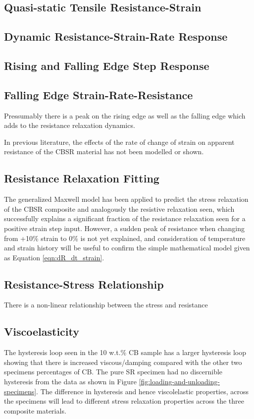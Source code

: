\subsection{Quasi-static Tensile Resistance-Strain}


\subsection{Dynamic Resistance-Strain-Rate Response}


\subsection{Rising and Falling Edge Step Response}


\subsection{Falling Edge Strain-Rate-Resistance}
Pressumably there is a peak on the rising edge as well as the falling edge which adds to the resistance relaxation dynamics.

In previous literature, the effects of the rate of change of strain on apparent resistance of the CBSR material has not been modelled or shown.

\subsection{Resistance Relaxation Fitting}
The generalized Maxwell model has been applied to predict the stress relaxation of the CBSR composite and analogously the resistive relaxation seen, which successfully explains a significant fraction of the resistance relaxation seen for a positive strain step input. However, a sudden peak of resistance when changing from +10\% strain to 0\% is not yet explained, and consideration of temperature and strain history \cite{Fung1993} will be useful to confirm the simple mathematical model given as Equation \ref{eqn:dR_dt_strain}.


\subsection{Resistance-Stress Relationship}
There is a non-linear relationship between the stress and resistance


\subsection{Viscoelasticity}
The hysteresis loop seen in the 10 w.t.\% CB sample has a larger hysteresis loop showing that there is increased viscous/damping compared with the other two specimens percentages of CB. The pure SR specimen had no discernible hysteresis from the data as shown in Figure \ref{fig:loading-and-unloading-specimens}.  The difference in hysteresis and hence viscolelastic properties, across the specimens will lead to different stress relaxation properties across the three composite materials.


